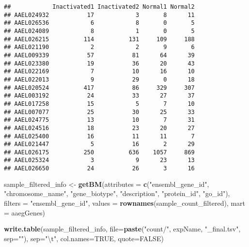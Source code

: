 \documentclass[]{article}
\newenvironment{Shaded}{\begin{snugshade}}{\end{snugshade}}
\newcommand{\KeywordTok}[1]{\textcolor[rgb]{0.13,0.29,0.53}{\textbf{#1}}}
\newcommand{\DataTypeTok}[1]{\textcolor[rgb]{0.13,0.29,0.53}{#1}}
\newcommand{\CharTok}[1]{\textcolor[rgb]{0.31,0.60,0.02}{#1}}
\newcommand{\StringTok}[1]{\textcolor[rgb]{0.31,0.60,0.02}{#1}}
\newcommand{\OtherTok}[1]{\textcolor[rgb]{0.56,0.35,0.01}{#1}}
\newcommand{\NormalTok}[1]{#1}
\begin{document}
\begin{verbatim}
##            Inactivated1 Inactivated2 Normal1 Normal2
## AAEL024932           17            3       8      11
## AAEL026536            6            8       0       5
## AAEL024089            8            1       0       5
## AAEL026215          114          131     109     188
## AAEL021190            2            2       9       6
## AAEL009339           57           81      64      39
## AAEL023380           19           36      20      43
## AAEL022169            7           10      16      10
## AAEL022013            9           29       0      18
## AAEL020524          417           86     329     307
## AAEL003192           24           33      27      37
## AAEL017258           15            5       7      10
## AAEL007077           25           30      25      33
## AAEL024775           13           10       7      31
## AAEL024516           18           23      20      27
## AAEL025400           16           11      11       7
## AAEL021447            5           16       2      29
## AAEL026175          250          636    1057     869
## AAEL025324            3            9      23      13
## AAEL026650           24           26       3      16
\end{verbatim}

\begin{Shaded}
\begin{Highlighting}[]
\NormalTok{sample_filtered_info <-}\StringTok{ }\KeywordTok{getBM}\NormalTok{(}\DataTypeTok{attributes =} \KeywordTok{c}\NormalTok{(}\StringTok{"ensembl_gene_id"}\NormalTok{, }\StringTok{"chromosome_name"}\NormalTok{, }\StringTok{"gene_biotype"}\NormalTok{, }\StringTok{"description"}\NormalTok{, }\StringTok{"protein_id"}\NormalTok{, }\StringTok{"go_id"}\NormalTok{), }\DataTypeTok{filters =} \StringTok{"ensembl_gene_id"}\NormalTok{, }\DataTypeTok{values =} \KeywordTok{rownames}\NormalTok{(sample_count_filtered),  }\DataTypeTok{mart =}\NormalTok{ aaegGenes)}

\KeywordTok{write.table}\NormalTok{(sample_filtered_info, }\DataTypeTok{file=}\KeywordTok{paste}\NormalTok{(}\StringTok{"count/"}\NormalTok{, expName, }\StringTok{"_final.tsv"}\NormalTok{, }\DataTypeTok{sep=}\StringTok{""}\NormalTok{), }\DataTypeTok{sep=}\StringTok{"}\CharTok{\textbackslash{}t}\StringTok{"}\NormalTok{, }\DataTypeTok{col.names=}\OtherTok{TRUE}\NormalTok{, }\DataTypeTok{quote=}\OtherTok{FALSE}\NormalTok{)}
\end{Highlighting}
\end{Shaded}
\end{document}
